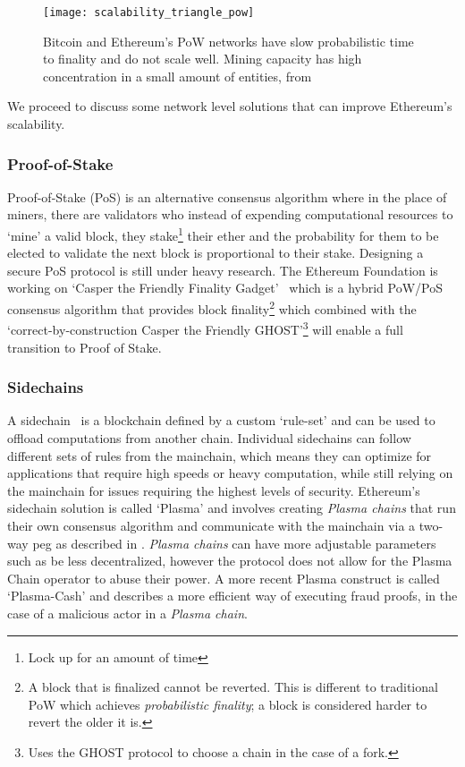 \begin{figure}[ht!]
    \centering
    \texttt{[image: scalability\_triangle\_pow]}
    \caption{Bitcoin and Ethereum's PoW networks have slow probabilistic time to finality and do not scale well. Mining capacity has high concentration in a small amount of entities, from \cite{scaling-trustless-models}}
    \label{fig:scalability_triangle_pow}
\end{figure}

We proceed to discuss some network level solutions that can improve Ethereum's scalability.

\subsubsection*{Proof-of-Stake}
Proof-of-Stake (PoS) is an alternative consensus algorithm where in the place of miners, there are validators who instead of expending computational resources to `mine' a valid block, they stake\footnote{Lock up for an amount of time} their ether and the probability for them to be elected to validate the next block is proportional to their stake. Designing a secure PoS protocol is still under heavy research. The Ethereum Foundation is working on `Casper the Friendly Finality Gadget'~\cite{casperffg} which is a hybrid PoW/PoS consensus algorithm that provides block finality\footnote{A block that is finalized cannot be reverted. This is different to traditional PoW which achieves \textit{probabilistic finality}; a block is considered harder to revert the older it is.} which combined with the `correct-by-construction Casper the Friendly GHOST'\footnote{Uses the GHOST protocol to choose a chain in the case of a fork.} \cite{caspertfg} will enable a full transition to Proof of Stake. 

\subsubsection*{Sidechains}
A sidechain~\cite{sidechains} is a blockchain defined by a custom `rule-set' and can be used to offload computations from another chain. Individual sidechains can follow different sets of rules from the mainchain, which means they can optimize for applications that require high speeds or heavy computation, while still relying on the mainchain for issues requiring the highest levels of security. Ethereum's sidechain solution is called `Plasma' \cite{plasma} and involves creating \textit{Plasma chains} that run their own consensus algorithm and communicate with the mainchain via a two-way peg as described in \cite{sidechains}. \textit{Plasma chains} can have more adjustable parameters such as be less decentralized, however the protocol does not allow for the Plasma Chain operator to abuse their power. A more recent Plasma construct is called `Plasma-Cash' \cite{plasmacash} and describes a more efficient way of executing fraud proofs, in the case of a malicious actor in a \textit{Plasma chain}.


